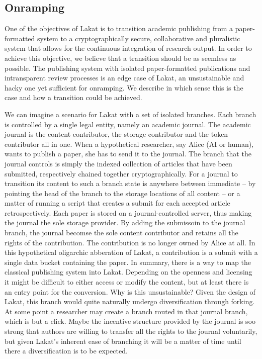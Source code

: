 \documentclass[14pt]{article}
\begin{document}
\subsection{Onramping}
\label{ssc:onramping}

One of the objectives of Lakat is to transition academic publishing from a paper-formatted system to a cryptographically secure, collaborative and pluralistic system that allows for the continuous integration of research output. In order to achieve this objective, we believe that a transition should be as seemless as possible. The publishing system with isolated paper-formatted publications and intransparent review processes is an edge case of Lakat, an unsustainable and hacky one yet sufficient for onramping. We describe in which sense this is the case and how a transition could be achieved.

We can imagine a scenario for Lakat with a set of isolated branches. Each branch is controlled by a single legal entity, namely an academic journal. The academic journal is the content contributor, the storage contributor and the token contributor all in one. When a hypothetical researcher, say Alice (AI or human), wants to publish a paper, she has to send it to the journal. The branch that the journal  controls is simply the indexed collection of articles that have been submitted, respectively chained together cryptographically. For a journal to transition its content to such a branch state is anywhere between immediate -- by pointing the head of the branch to the storage locations of all content -- or a matter of running a script that creates a submit for each accepted article retrospectively.  Each paper is stored on a journal-controlled server, thus making the journal the sole storage provider. By adding the submissoin to the journal branch, the journal becomse the sole content contributor and retains all the rights of the contribution. The contribution is no longer owned by Alice at all. In this hypothetical oligarchic abberation of Lakat, a contribution is a submit with a single data bucket containing the paper. In summary, there is a way to map the classical publishing system into Lakat. Depending on the openness and licensing it might be difficult to either access or modify the content, but at least there is an entry point for the conversion.
Why is this unsustainable?  Given the design of Lakat, this branch would quite naturally undergo diversification through forking. At some point a researcher may create a branch routed in that journal branch, which is but a click. Maybe the incentive structure provided by the journal is soo strong that authors are willing to transfer all the rights to the journal voluntarily, but given Lakat's inherent ease of branching it will be a matter of time until there a diversification is to be expected.
\end{document}
